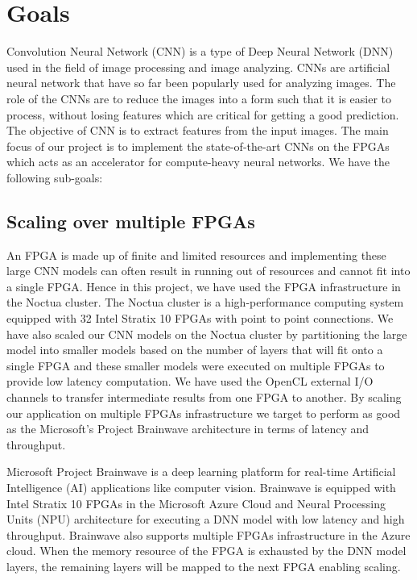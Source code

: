 \chapter{Goals}
Convolution Neural Network (CNN) is a type of Deep Neural Network (DNN) used in the field of image processing and image analyzing. CNNs are artificial neural network that have so far been popularly used for analyzing images. The role of the CNNs are to reduce the images into a form such that it is easier to process, without losing features which are critical for getting a good prediction. The objective of CNN is to extract features from the input images. 
The main focus of our project is to implement the state-of-the-art CNNs on the FPGAs which acts as an accelerator for compute-heavy neural networks. We have the following sub-goals:
\section{Scaling over multiple FPGAs}
An FPGA is made up of finite and limited resources and implementing these large CNN models can often result in running out of resources and cannot fit into a single FPGA. Hence in this project, we have used the FPGA infrastructure in the Noctua cluster. The Noctua cluster is a high-performance computing system equipped with 32 Intel Stratix 10 FPGAs with point to point connections. We have also scaled our CNN models on the Noctua cluster by partitioning the large model into smaller models based on the number of layers that will fit onto a single FPGA and these smaller models were executed on multiple FPGAs to provide low latency computation. We have used the OpenCL external I/O channels to transfer intermediate results from one FPGA to another. By scaling our application on multiple FPGAs infrastructure we target to perform as good as the Microsoft's Project Brainwave architecture in terms of latency and throughput.
\par
Microsoft Project Brainwave is a deep learning platform for real-time Artificial Intelligence (AI) applications like computer vision. Brainwave is equipped with Intel Stratix 10 FPGAs in the Microsoft Azure Cloud and Neural Processing Units (NPU) architecture for executing a DNN model with low latency and high throughput. Brainwave also supports multiple FPGAs infrastructure in the Azure cloud. When the memory resource of the FPGA is exhausted by the DNN model layers, the remaining layers will be mapped to the next FPGA enabling scaling.

